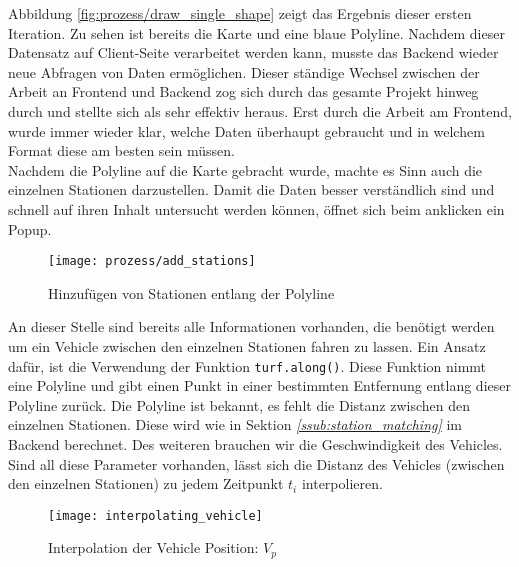 \begin{newpage}
      Abbildung \ref{fig:prozess/draw_single_shape} zeigt das Ergebnis dieser ersten Iteration. Zu sehen ist bereits die Karte und eine blaue Polyline. Nachdem dieser Datensatz auf Client-Seite verarbeitet werden kann, musste das Backend wieder neue Abfragen von Daten ermöglichen. Dieser ständige Wechsel zwischen der Arbeit an Frontend und Backend zog sich durch das gesamte Projekt hinweg durch und stellte sich als sehr effektiv heraus. Erst durch die Arbeit am Frontend, wurde immer wieder klar, welche Daten überhaupt gebraucht und in welchem Format diese am besten sein müssen.\\

      Nachdem die Polyline auf die Karte gebracht wurde, machte es Sinn auch die einzelnen Stationen darzustellen. Damit die Daten besser verständlich sind und schnell auf ihren Inhalt untersucht werden können, öffnet sich beim anklicken ein Popup.

      \begin{figure}[htbp]
        \begin{center}
          \texttt{[image: prozess/add\_stations]}
          \caption{Hinzufügen von Stationen entlang der Polyline}
          \label{fig:prozess/add_stations}
        \end{center}
      \end{figure}

      An dieser Stelle sind bereits alle Informationen vorhanden, die benötigt werden um ein Vehicle zwischen den einzelnen Stationen fahren zu lassen. Ein Ansatz dafür, ist die Verwendung der Funktion \texttt{turf.along()}. Diese Funktion nimmt eine Polyline und gibt einen Punkt in einer bestimmten Entfernung entlang dieser Polyline zurück. Die Polyline ist bekannt, es fehlt die Distanz zwischen den einzelnen Stationen. Diese wird wie in Sektion \textit{\ref{ssub:station_matching} } im Backend berechnet. Des weiteren brauchen wir die Geschwindigkeit des Vehicles. Sind all diese Parameter vorhanden, lässt sich die Distanz des Vehicles (zwischen den einzelnen Stationen) zu jedem Zeitpunkt $t_i$ interpolieren.

      \begin{figure}[htbp]
        \begin{center}
          \texttt{[image: interpolating\_vehicle]}
          \caption{Interpolation der Vehicle Position: $V_p$}
          \label{fig:interpolating_vehicle}
        \end{center}
      \end{figure}


\end{newpage}
